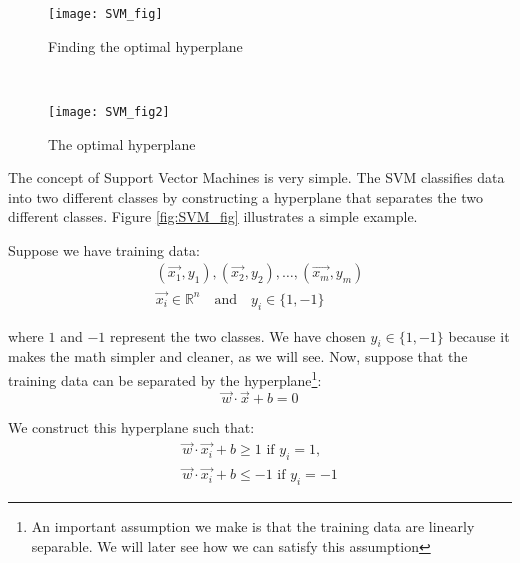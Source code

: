 
\begin{figure*}[!tb]
	\begin{subfigure}[t]{0.5\textwidth}
		\texttt{[image: SVM\_fig]}
		\caption{Finding the optimal hyperplane}
		\centering
		\label{fig:SVM_fig_a}
	\end{subfigure}%
	~
	\begin{subfigure}[t]{0.5\textwidth}
		\texttt{[image: SVM\_fig2]}
		\caption{The optimal hyperplane}
		\centering
		\label{fig:SVM_fig_b}
	\end{subfigure}%
	
	\caption{Figure \ref{fig:SVM_fig_a} shows $3$ different separating hyperplanes, however only one separates the data most naturally. This is called the optimal hyperplane. Figure \ref{fig:SVM_fig_b} shows the optimal hyperplane, the margin planes, and the support vectors.}
	\label{fig:SVM_fig}
\end{figure*}

The concept of Support Vector Machines is very simple. The SVM classifies data into two different classes by constructing a hyperplane that separates the two different classes. Figure \ref{fig:SVM_fig} illustrates a simple example.

Suppose we have training data:
\begin{gather}
(\vec{x_1}, y_1),  (\vec{x_2}, y_2), \dots, (\vec{x_m}, y_m) \nonumber\\
\vec{x_i} \in \mathbb{R}^{n} \quad\text{and}\quad y_i \in \{1, -1\} \nonumber
\end{gather}

where $1$ and $-1$ represent the two classes. We have chosen $ y_i \in \{1, -1\}$ because it makes the math simpler and cleaner, as we will see. Now, suppose that the training data can be separated by the hyperplane\footnote{An important assumption we make is that the training data are linearly separable. We will later see how we can satisfy this assumption}:
\begin{equation}
\vec{w}\cdot\vec{x} + b = 0 \label{eq:optimal-plane}
\end{equation}

We construct this hyperplane such that:
\begin{gather}
\vec{w}\cdot\vec{x_i} + b \geq 1 \text{ if $y_i = 1$,} \label{eq:class-1} \\
\vec{w}\cdot\vec{x_i} + b \leq -1 \text{ if $y_i = -1$} \label{eq:notclass-1} 
\end{gather}

